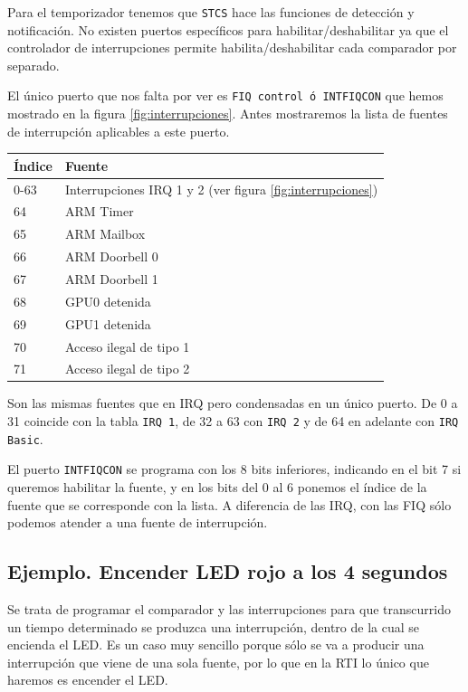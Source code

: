 Para el temporizador tenemos que {\tt STCS} hace las funciones de detección y notificación. No
existen puertos específicos para habilitar/deshabilitar ya que el controlador de
interrupciones permite habilita/deshabilitar cada comparador por separado.

El único puerto que nos falta por ver es {\tt FIQ control ó INTFIQCON} que hemos
mostrado en la figura \ref{fig:interrupciones}. Antes mostraremos la lista de fuentes
de interrupción aplicables a este puerto.

\begin{table}
\centering
\begin{tabular}{ p{2cm} | p{8cm}} \hline
{\bf Índice} & {\bf Fuente} \\ \hline
0-63  & Interrupciones IRQ 1 y 2 (ver figura \ref{fig:interrupciones})  \\ \hline
64    & ARM Timer  \\ \hline
65    & ARM Mailbox \\ \hline
66    & ARM Doorbell 0 \\ \hline
67    & ARM Doorbell 1 \\ \hline
68    & GPU0 detenida \\ \hline
69    & GPU1 detenida \\ \hline
70    & Acceso ilegal de tipo 1 \\ \hline
71    & Acceso ilegal de tipo 2 \\ \hline
\end{tabular}
\end{table}

Son las mismas fuentes que en IRQ pero condensadas en un único puerto. De 0 a 31 coincide
con la tabla {\tt IRQ 1}, de 32 a 63 con {\tt IRQ 2} y de 64 en adelante con {\tt IRQ Basic}.

El puerto {\tt INTFIQCON} se programa con los 8 bits inferiores, indicando en el bit 7 si
queremos habilitar la fuente, y en los bits del 0 al 6 ponemos el índice de la fuente que
se corresponde con la lista. A diferencia de las IRQ, con las FIQ sólo podemos atender a
una fuente de interrupción. 

\subsection{Ejemplo. Encender LED rojo a los 4 segundos}

Se trata de programar el comparador y las interrupciones para que
transcurrido un tiempo determinado se produzca una interrupción, dentro
de la cual se encienda el LED. Es un caso muy sencillo porque sólo
se va a producir una interrupción que viene de una sola fuente, por
lo que en la RTI lo único que haremos es encender el LED.

